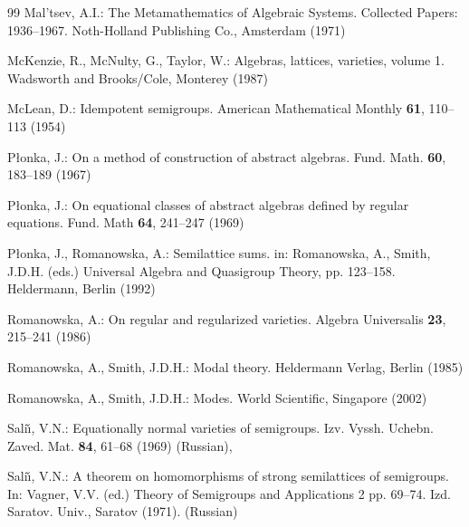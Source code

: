 \documentclass{birkau}
\theoremstyle{plain}
\theoremstyle{definition}
\numberwithin{equation}{section}
\begin{document}
\begin{thebibliography}{99}
Mal'tsev, A.I.:
The Metamathematics of Algebraic Systems. Collected Papers: 1936--1967.
Noth-Holland Publishing Co., Amsterdam (1971)

McKenzie, R., McNulty, G., Taylor, W.:
Algebras, lattices, varieties, volume 1.
Wadsworth and Brooks/Cole, Monterey (1987)

McLean, D.:
Idempotent semigroups.
American Mathematical Monthly \textbf{61}, 110--113 (1954)

P\l onka, J.:
On a method of construction of abstract algebras.
Fund. Math. \textbf{60}, 183--189 (1967)

P\l onka, J.:
On equational classes of abstract algebras defined by regular equations.
Fund. Math \textbf{64}, 241--247 (1969)


P\l onka, J., Romanowska, A.:
Semilattice sums.
in: Romanowska, A., Smith, J.D.H. (eds.)
Universal Algebra and Quasigroup Theory, pp. 123--158.
Heldermann, Berlin (1992)

Romanowska, A.:
On regular and regularized varieties.
Algebra Universalis \textbf{23}, 215--241  (1986)

Romanowska, A., Smith, J.D.H.:
Modal theory.
Heldermann Verlag, Berlin (1985)

Romanowska, A., Smith, J.D.H.:
Modes.
World Scientific, Singapore (2002)

Sali\v{\i}, V.N.:
Equationally normal varieties of semigroups. 
Izv. Vyssh. Uchebn. Zaved. Mat. \textbf{84}, 61--68  (1969) (Russian),

Sali\v{\i}, V.N.:
A theorem on homomorphisms of strong semilattices of semigroups. 
In: Vagner, V.V. (ed.) Theory of Semigroups and Applications 2 pp. 69--74.
Izd. Saratov. Univ., Saratov (1971). (Russian)


\end{thebibliography}
\end{document}
